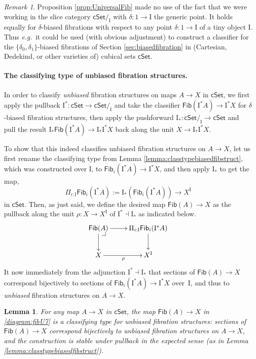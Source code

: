 \documentclass[12pt]{article}
\makeatletter
\newcommand{\eg}{\emph{e.g.}}
\newcommand{\cSet}{\ensuremath{\mathsf{cSet}}}
\newcommand{\ra}{\ensuremath{\rightarrow}}
\renewcommand{\to}{\ensuremath{\rightarrow}}
\newcommand{\too}{\ensuremath{\longrightarrow}}
\newcommand{\I}{\ensuremath{\mathrm{I}}}
\newcommand{\Fib}{\ensuremath{\mathsf{Fib}}}
\newtheorem{lemma}[theorem]{Lemma}
\theoremstyle{remark}
\newtheorem{remark}[theorem]{Remark}
\theoremstyle{definition}
\newcommand{\pbcorner}[1][dr]{\save*!/#1-1.2pc/#1:(-1,1)@^{|-}\restore}
\makeatother
\begin{document}
\begin{remark}
Proposition \ref{prop:UniversalFib} made no use of the fact that we were working in the slice category $\cSet/_\I$ with $\delta : 1\to\I$ the generic point. It holds equally for $\delta$-biased fibrations with respect to any point $\delta: 1\to\I$ of a tiny object $\I$.  Thus \eg\ it could be used (with obvious adjustment) to construct a classifier for the $\{\delta_0, \delta_1\}$-biased fibrations of Section \ref{sec:biasedfibration} in (Cartesian, Dedekind, or other varieties of) cubical sets $\cSet$.  
\end{remark}


\paragraph{The classifying type of unbiased fibration structures.}\label{par:classifyunbiasedfib} 

In order to classify \emph{unbiased} fibration structures on maps $A\to X$ in $\cSet$, we first apply the pullback $\I^*: \cSet \ra \cSet/_\I$ and take the classifier $\Fib(\I^*A)\ra \I^*X$ for $\delta$-biased fibration structures, then apply the pushforward $\I_*: \cSet/_\I \ra \cSet$ and pull the result   $\I_*\Fib(\I^*A)\ra \I_*\I^*X$ back along the unit  $X \to \I_*\I^*X$.  

To show that this indeed classifies unbiased fibration structures on $A\to X$, let us first rename the classifying type from Lemma \ref{lemma:classtypebiasedfibstruct}, which was constructed over $\I$, to $\Fib_i(\I^*A) \ra \I^{*}X$, and then apply $\I_*$ to get the map,
\[
\Pi_{i:\I}\Fib_i(\I^*A) := \I_*(\Fib_i(\I^*A)) \too X^\I
\]
in $\cSet$.  Then, as just said, we define the desired map $\Fib(A)\ra X$ as the pullback along the unit $\rho : X \ra X^\I$ of  $\I^*\dashv \I_*$ as indicated below.
\begin{equation}\label{diagram:fibU7}
\xymatrix{
 \Fib(A) \ar[d] \ar[r] \pbcorner & \ar[d] \Pi_{i:\I}\Fib_i(\I^*A) \\
 X \ar[r]_{\rho} &  X^\I
}
\end{equation}
It now immediately from the adjunction $\I^*\dashv \I_*$ that sections of $\Fib(A)\ra X$ correspond bijectively to sections of $\Fib_i (\I^*A)\ra \I^{*}X$ over~$\I$, and thus to \emph{unbiased} fibration structures on $A\to X$.

\begin{lemma}\label{lemma:classtypeunbiasedfibstruct}
For any map $A\ra X$ in $\cSet$, the map $\Fib(A)\ra X$ in \eqref{diagram:fibU7} is a \emph{classifying type for unbiased fibration structures}: sections of $\Fib(A)\ra X$ correspond bijectively to unbiased fibration structures on $A\ra X$, and the construction is stable under pullback in the expected sense (as in Lemma \ref{lemma:classtypebiasedfibstruct}).
\end{lemma}
\end{document}
